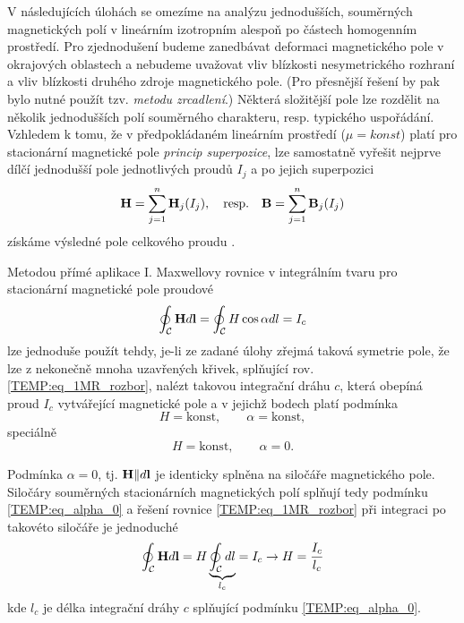     V následujících úlohách se omezíme na analýzu jednodušších, souměrných magnetických polí v 
    lineárním izotropním alespoň po částech homogenním prostředí. Pro zjednodušení budeme 
    zanedbávat deformaci magnetického pole v okrajových oblastech a nebudeme uvažovat vliv 
    blízkosti nesymetrického rozhraní a vliv blízkosti druhého zdroje magnetického pole. (Pro 
    přesnější řešení by pak bylo nutné použít tzv. \emph{metodu zrcadlení}.) Některá složitější 
    pole lze rozdělit na několik jednodušších polí souměrného charakteru, resp. typického 
    uspořádání. Vzhledem k tomu, že v předpokládaném lineárním prostředí ($\mu 
    = konst$) platí pro stacionární magnetické pole \emph{princip superpozice}, lze samostatně 
    vyřešit nejprve dílčí jednodušší pole jednotlivých proudů $I_j$ a po jejich superpozici
      \begin{equation}\label{TEMP:eq_superp_mag_pole}
        \mathbf{H}= \sum_{j=1}^n\mathbf{H}_j(I_j), \quad\text{resp.}\quad \mathbf{B}= 
        \sum_{j=1}^n\mathbf{B}_j(I_j)   
      \end{equation}
    získáme výsledné pole celkového proudu \cite[s.~181]{Kotlan1999}. 
    
    Metodou přímé aplikace I. Maxwellovy rovnice v integrálním tvaru pro stacionární magnetické
    pole proudové
      \begin{equation}\label{TEMP:eq_1MR_rozbor}
        \oint_\mathcal{C}\mathbf{H}d\mathbf{l} = \oint_\mathcal{C}H\cos\alpha dl = I_c
      \end{equation}    
    lze jednoduše použít tehdy, je-li ze zadané úlohy zřejmá taková symetrie pole, že lze z 
    nekonečně mnoha uzavřených křivek, splňující rov. \ref{TEMP:eq_1MR_rozbor}, nalézt takovou 
    integrační dráhu $c$, která obepíná proud $I_c$ vytvářející magnetické pole a v jejichž bodech 
    platí podmínka
      \begin{equation}\label{TEMP:eq_H_alpha_konst}
        H = \text{konst}, \qquad \alpha = \text{konst},
      \end{equation}    
    speciálně
      \begin{equation}\label{TEMP:eq_alpha_0}
        H = \text{konst}, \qquad \alpha = 0.
      \end{equation}
    
    Podmínka $\alpha = 0$, tj. $\mathbf{H}\| d\mathbf{l}$ je identicky splněna na siločáře magnetického 
    pole. Siločáry souměrných stacionárních magnetických polí splňují tedy podmínku 
    \ref{TEMP:eq_alpha_0} a řešení rovnice \ref{TEMP:eq_1MR_rozbor} při integraci po takovéto 
    siločáře je jednoduché
      \begin{equation}\label{TEMP:eq_1MR_alpha0}
        \oint_\mathcal{C}\mathbf{H}d\mathbf{l} = H\underbrace{\oint_\mathcal{C} dl}_{l_c} = 
                                         I_c \rightarrow H = \frac{I_c}{l_c}
      \end{equation}            
    kde $l_c$ je délka integrační dráhy $c$ splňující podmínku \ref{TEMP:eq_alpha_0}.
      
